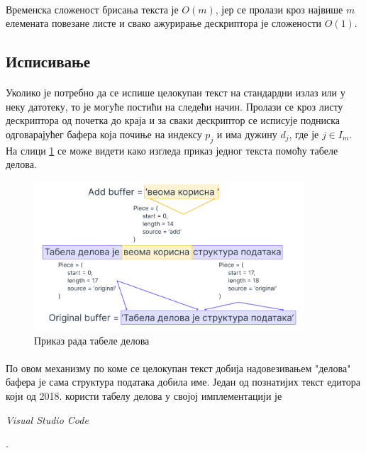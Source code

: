 \documentclass[12pt,oneside]{memoir}
\begin{document}
\paragraph{}
Временска сложеност брисања текста је \(O(m)\), јер се пролази кроз највише \(m\)
елемената повезане листе и свако ажурирање дескриптора је сложености \(O(1)\).

\subsection{Исписивање}
\paragraph{}
Уколико је потребно да се испише целокупан текст на стандардни излаз или у неку датотеку,
то је могуће постићи на следећи начин. Пролази се кроз листу дескриптора од почетка до краја
и за сваки дескриптор се исписује подниска одговарајућег бафера која почиње на индексу 
\(p_j\) и има дужину \(d_j\), где је \(j \in I_m\). На слици \ref{fig:piece_table} се може
видети како изгледа приказ једног текста помоћу табеле делова.

\begin{figure}[!ht]
	\centering
	\includegraphics[width=0.9\textwidth]{images/piece_table_1.png}
	\caption{Приказ рада табеле делова}
	\label{fig:piece_table}
\end{figure}

\paragraph{}
По овом механизму по коме се целокупан текст добија надовезивањем "делова" бафера
је сама структура података добила име. Један од познатијих текст едитора који од 2018. 
користи табелу делова у својој имплементацији је \begin{latinica}\textit{Visual Studio Code}\end{latinica} \cite{VSC}.
\end{document}
